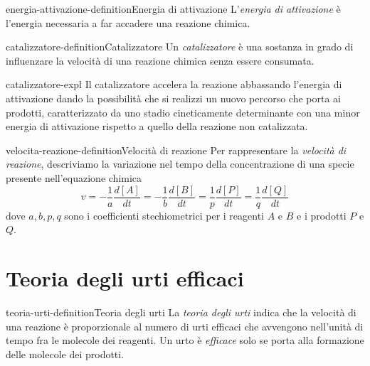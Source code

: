 \documentclass[preview]{standalone}
\begin{document}
\genpage

\begin{snippetdefinition}{energia-attivazione-definition}{Energia di attivazione}
    L'\textit{energia di attivazione} è l'energia necessaria
    a far accadere una reazione chimica.
\end{snippetdefinition}

\begin{snippetdefinition}{catalizzatore-definition}{Catalizzatore}
    Un \textit{catalizzatore} è
    una sostanza in grado di influenzare la
    velocità di una reazione chimica senza essere consumata.
\end{snippetdefinition}

\begin{snippet}{catalizzatore-expl}
    Il catalizzatore accelera la reazione abbassando l'energia
di attivazione dando la possibilità che si realizzi un nuovo
percorso che porta ai prodotti, caratterizzato da uno stadio
cineticamente determinante con una minor energia di
attivazione rispetto a quello della reazione non catalizzata.
\end{snippet}

\begin{snippetdefinition}{velocita-reazione-definition}{Velocità di reazione}
    Per rappresentare la \textit{velocità di reazione}, descriviamo la
    variazione nel tempo della concentrazione di una specie
    presente nell'equazione chimica
    \[
        v
        = - \frac{1}{a} \frac{d[A]}{dt}
        = - \frac{1}{b} \frac{d[B]}{dt}
        = \frac{1}{p} \frac{d[P]}{dt}
        = \frac{1}{q} \frac{d[Q]}{dt}
    \]
    dove \(a,b,p,q\) sono i coefficienti stechiometrici
    per i reagenti \(A\) e \(B\) e i prodotti \(P\) e \(Q\).
\end{snippetdefinition}

\section{Teoria degli urti efficaci}

\begin{snippetdefinition}{teoria-urti-definition}{Teoria degli urti}
    La \textit{teoria degli urti}
    indica che 
    la velocità di una reazione è
    proporzionale al numero di urti efficaci che avvengono
    nell'unità di tempo fra le molecole dei reagenti.
    Un urto è \textit{efficace} solo se porta alla formazione delle
    molecole dei prodotti.
\end{snippetdefinition}
\end{document}
